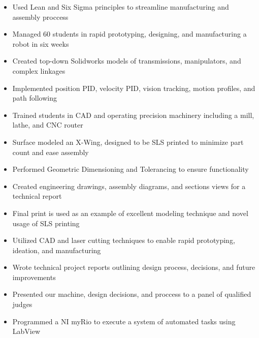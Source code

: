 \documentclass{resume}
\begin{document}
\begin{itemize}
  \item Used Lean and Six Sigma principles to streamline manufacturing and assembly proccess
  \item Managed 60 students in rapid prototyping, designing, and manufacturing a robot in six weeks
  \item Created top-down Solidworks models of transmissions, manipulators, and complex linkages
  \item Implemented position PID, velocity PID, vision tracking, motion profiles, and path following
  \item Trained students in CAD and operating precision machinery including a mill, lathe, and CNC router
\end{itemize}

\begin{itemize}
  \item Surface modeled an X-Wing, designed to be SLS printed to minimize part count and ease assembly
  \item Performed Geometric Dimensioning and Tolerancing to ensure functionality
  \item Created engineering drawings, assembly diagrams, and sections views for a technical report
  \item Final print is used as an example of excellent modeling technique and novel usage of SLS printing
\end{itemize}

\begin{itemize}
  \item Utilized CAD and laser cutting techniques to enable rapid prototyping, ideation, and manufacturing
  \item Wrote technical project reports outlining design process, decisions, and future improvements
  \item Presented our machine, design decisions, and proccess to a panel of qualified judges
  \item Programmed a NI myRio to execute a system of automated tasks using LabView
\end{itemize}
\end{document}
